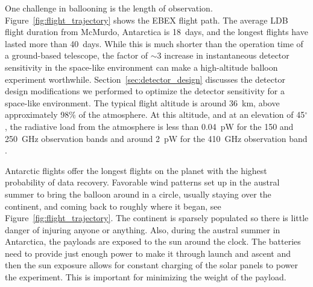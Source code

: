 One challenge in ballooning is the length of observation. 
Figure~\ref{fig:flight_trajectory} shows the \ac{EBEX} flight path. 
The average \ac{LDB} flight duration from McMurdo, Antarctica is 18~days, and the longest flights have lasted more than 40~days.  
While this is much shorter than the operation time of a ground-based telescope, the factor of $\sim$3 increase in instantaneous detector sensitivity in the space-like environment can make a high-altitude balloon experiment worthwhile. 
Section~\ref{sec:detector_design} discusses the detector design modifications we performed to optimize the detector sensitivity for a space-like environment. 
The typical flight altitude is around 36~km, above approximately 98\% of the atmosphere. 
At this altitude, and at an elevation of 45$^\circ$, the radiative load from the atmosphere is less than 0.04~pW for the 150 and 250~GHz observation bands and around 2~pW for the 410~GHz observation band \cite{Bao2015}. 


Antarctic flights offer the longest flights on the planet with the highest probability of data recovery. 
Favorable wind patterns set up in the austral summer to bring the balloon around in a circle, usually staying over the continent, and coming back to roughly where it began, see Figure~\ref{fig:flight_trajectory}. 
The continent is sparsely populated so there is little danger of injuring anyone or anything. 
Also, during the austral summer in Antarctica, the payloads are exposed to the sun around the clock. 
The batteries need to provide just enough power to make it through launch and ascent and then the sun exposure allows for constant charging of the solar panels to power the experiment. 
This is important for minimizing the weight of the payload. 

